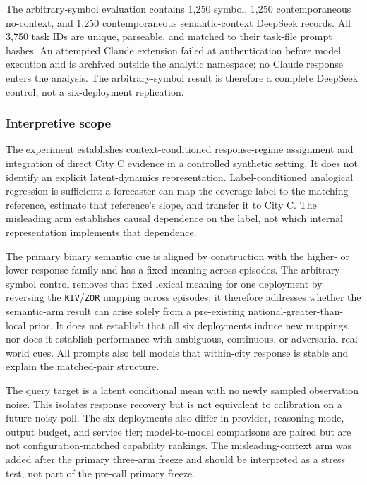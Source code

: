 The arbitrary-symbol evaluation contains 1,250 symbol, 1,250 contemporaneous
no-context, and 1,250 contemporaneous semantic-context DeepSeek records. All 3,750
task IDs are unique, parseable, and matched to their task-file prompt hashes. An
attempted Claude extension failed at authentication before model execution and is
archived outside the analytic namespace; no Claude response enters the analysis.
The arbitrary-symbol result is therefore a complete DeepSeek control, not a
six-deployment replication.

\subsubsection{Interpretive scope}
The experiment establishes context-conditioned response-regime assignment and
integration of direct City C evidence in a controlled synthetic setting. It does
not identify an explicit latent-dynamics representation. Label-conditioned
analogical regression is sufficient: a forecaster can map the coverage label to
the matching reference, estimate that reference's slope, and transfer it to City
C. The misleading arm establishes causal dependence on the label, not which
internal representation implements that dependence.

The primary binary semantic cue is aligned by construction with the higher- or
lower-response family and has a fixed meaning across episodes. The arbitrary-symbol
control removes that fixed lexical meaning for one deployment by reversing the
\texttt{KIV}/\texttt{ZOR} mapping across episodes; it therefore addresses whether
the semantic-arm result can arise solely from a pre-existing
national-greater-than-local prior. It does not establish that all six deployments
induce new mappings, nor does it establish performance with ambiguous,
continuous, or adversarial real-world cues. All prompts also tell models that
within-city response is stable and explain the matched-pair structure.

The query target is a latent conditional mean with no newly sampled observation
noise. This isolates response recovery but is not equivalent to calibration on a
future noisy poll. The six deployments also differ in provider, reasoning mode,
output budget, and service tier; model-to-model comparisons are paired but are not
configuration-matched capability rankings. The misleading-context arm was added
after the primary three-arm freeze and should be interpreted as a stress test,
not part of the pre-call primary freeze.

